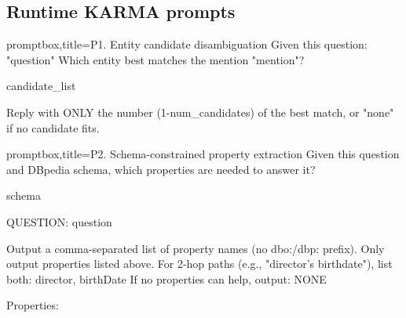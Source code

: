 \documentclass[11pt]{article}
\newcommand{\sysname}{\textsc{KARMA}\xspace}
\begin{document}

\subsection{Runtime \sysname prompts}

\begin{tcblisting}{promptbox,title={P1. Entity candidate disambiguation}}
Given this question: "{question}"
Which entity best matches the mention "{mention}"?

{candidate_list}

Reply with ONLY the number (1-{num_candidates}) of the best match, or "none" if no candidate fits.
\end{tcblisting}

\begin{tcblisting}{promptbox,title={P2. Schema-constrained property extraction}}
Given this question and DBpedia schema, which properties are needed to answer it?

{schema}

QUESTION: {question}

Output a comma-separated list of property names (no dbo:/dbp: prefix).
Only output properties listed above. For 2-hop paths (e.g., "director's birthdate"),
list both: director, birthDate
If no properties can help, output: NONE

Properties:
\end{tcblisting}
\end{document}
